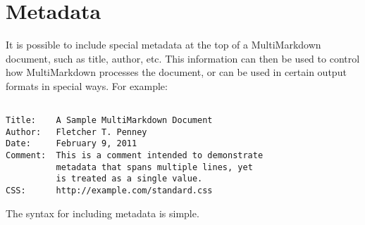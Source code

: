 
\def\mytitle{Metadata}
\def\myauthor{Fletcher T. Penney}
\def\revised{2018-06-26}




\tableofcontents

\section{Metadata }
\label{metadata}

It is possible to include special metadata at the top of a MultiMarkdown
document, such as title, author, etc. This information can then be used to
control how MultiMarkdown processes the document, or can be used in certain
output formats in special ways. For example:

\begin{verbatim}

Title:    A Sample MultiMarkdown Document  
Author:   Fletcher T. Penney  
Date:     February 9, 2011  
Comment:  This is a comment intended to demonstrate  
          metadata that spans multiple lines, yet  
          is treated as a single value.  
CSS:      http://example.com/standard.css
\end{verbatim}

The syntax for including metadata is simple.

